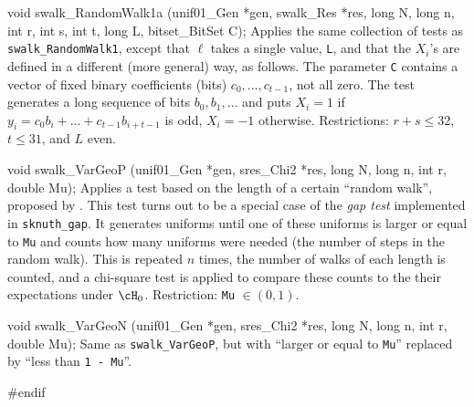void swalk_RandomWalk1a (unif01_Gen *gen, swalk_Res *res, long N, long n,
                         int r, int s, int t, long L, bitset_BitSet C);
\endcode
 \tab
   Applies the same collection of tests 
   as {\tt swalk\_RandomWalk1},
   except that $\ell$ takes a single value, {\tt L}, and that 
   the $X_i$'s are defined in a different (more general) way, as follows.
   The parameter {\tt C} contains a vector of fixed binary coefficients
   (bits) $c_0,\dots,c_{t-1}$, not all zero.
   The test generates a long sequence of bits $b_0, b_1, \dots$ and puts
   $X_i = 1$ if $y_i = c_0 b_i + \dots + c_{t-1} b_{i+t-1}$ 
   is odd, $X_i = -1$ otherwise.
   Restrictions: $r+s \le 32$, $t \le 31$, and $L$ even.
 \endtab
\code


void swalk_VarGeoP (unif01_Gen *gen, sres_Chi2 *res,
                    long N, long n, int r, double Mu);
\endcode
 \tab 
  Applies a test  
  based on the length of a certain ``random walk'',
  proposed by \cite{rSHC97a}.
  This test turns out to be a special case of the {\em gap test\/} 
  implemented in {\tt sknuth\_gap}.
  It generates uniforms until one of these uniforms is larger or equal
  to {\tt Mu} and counts how many uniforms were needed (the number of steps
  in the random walk).  
  This is repeated $n$ times, the number of walks of each length is
  counted, and a chi-square test is applied to compare these counts
  to the their expectations under $\cH_0$.
  Restriction: {\tt Mu} $\in (0, 1)$.
 \endtab
\code


void swalk_VarGeoN (unif01_Gen *gen, sres_Chi2 *res,
                    long N, long n, int r, double Mu);
\endcode
 \tab 
  Same as {\tt swalk\_VarGeoP},   
  but with ``larger or equal to
  {\tt Mu}'' replaced by ``less than {\tt 1 - Mu}''.
 \endtab

\code
\hide 
#endif
\endhide
\endcode
